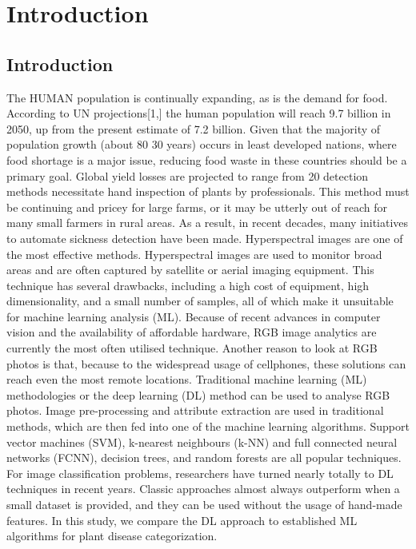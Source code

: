 
\chapter{Introduction}
\label{ch:INTR}
\section{Introduction}

The HUMAN population is continually expanding, as is the demand for food. According to
UN projections[1,] the human population will reach 9.7 billion in 2050, up from the present
estimate of 7.2 billion. Given that the majority of population growth (about 80%
30 years) occurs in least developed nations, where food shortage is a major issue, reducing
food waste in these countries should be a primary goal. Global yield losses are projected to
range from 20%
detection methods necessitate hand inspection of plants by professionals. This method must
be continuing and pricey for large farms, or it may be utterly out of reach for many small
farmers in rural areas. As a result, in recent decades, many initiatives to automate sickness
detection have been made. Hyperspectral images are one of the most effective methods.
Hyperspectral images are used to monitor broad areas and are often captured by satellite or
aerial imaging equipment. This technique has several drawbacks, including a high cost of
equipment, high dimensionality, and a small number of samples, all of which make it
unsuitable for machine learning analysis (ML). Because of recent advances in computer
vision and the availability of affordable hardware, RGB image analytics are currently the
most often utilised technique. Another reason to look at RGB photos is that, because to the
widespread usage of cellphones, these solutions can reach even the most remote locations.
Traditional machine learning (ML) methodologies or the deep learning (DL) method can be
used to analyse RGB photos. Image pre-processing and attribute extraction are used in
traditional methods, which are then fed into one of the machine learning algorithms. Support
vector machines (SVM), k-nearest neighbours (k-NN) and full connected neural networks
(FCNN), decision trees, and random forests are all popular techniques. For image
classification problems, researchers have turned nearly totally to DL techniques in recent
years. Classic approaches almost always outperform when a small dataset is provided, and
they can be used without the usage of hand-made features. In this study, we compare the DL
approach to established ML algorithms for plant disease categorization.

